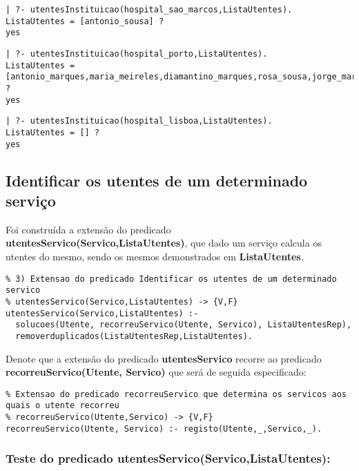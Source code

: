 \documentclass[
  oneside,
  10pt, a4paper,
  footinclude=true,
  headinclude=true,
  cleardoublepage=empty
]{scrbook}
\begin{document}
\begin{lstlisting}
| ?- utentesInstituicao(hospital_sao_marcos,ListaUtentes).
ListaUtentes = [antonio_sousa] ?  
yes
\end{lstlisting}

\begin{lstlisting}
| ?- utentesInstituicao(hospital_porto,ListaUtentes).
ListaUtentes = [antonio_marques,maria_meireles,diamantino_marques,rosa_sousa,jorge_marques] ? 
yes
\end{lstlisting}

\begin{lstlisting}
| ?- utentesInstituicao(hospital_lisboa,ListaUtentes).
ListaUtentes = [] ? 
yes
\end{lstlisting}



\subsection{Identificar os utentes de um determinado serviço}

Foi construída a extensão do predicado \textbf{utentesServico(Servico,ListaUtentes)}, que dado um serviço calcula os utentes do mesmo, sendo os mesmos demonstrados em \textbf{ListaUtentes}.\par 
\begin{lstlisting}
% 3) Extensao do predicado Identificar os utentes de um determinado servico
% utentesServico(Servico,ListaUtentes) -> {V,F}
utentesServico(Servico,ListaUtentes) :-
  solucoes(Utente, recorreuServico(Utente, Servico), ListaUtentesRep),
  removerduplicados(ListaUtentesRep,ListaUtentes).
\end{lstlisting}

Denote que a extensão do predicado \textbf{utentesServico} recorre ao predicado  \textbf{recorreuServico(Utente, Servico)} que será de seguida especificado:
\begin{lstlisting}
% Extensao do predicado recorreuServico que determina os servicos aos quais o utente recorreu
% recorreuServico(Utente,Servico) -> {V,F}
recorreuServico(Utente, Servico) :- registo(Utente,_,Servico,_).
\end{lstlisting}

\subsubsection{Teste do predicado \textbf{utentesServico(Servico,ListaUtentes)}:}
\end{document}
